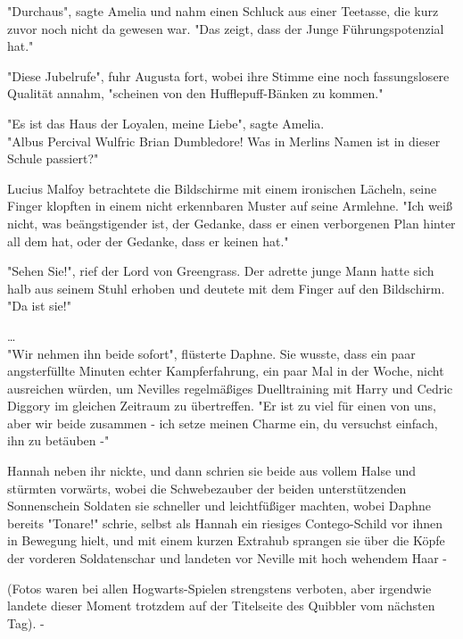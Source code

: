 {"Durchaus", sagte Amelia und nahm einen Schluck aus einer Teetasse, die kurz zuvor noch nicht da gewesen war. "Das zeigt, dass der Junge Führungspotenzial hat."

"Diese Jubelrufe", fuhr Augusta fort, wobei ihre Stimme eine noch fassungslosere Qualität annahm, "scheinen von den Hufflepuff-Bänken zu kommen."

"Es ist das Haus der Loyalen, meine Liebe", sagte Amelia.\\ "Albus Percival Wulfric Brian Dumbledore! Was in Merlins Namen ist in dieser Schule passiert?"

Lucius Malfoy betrachtete die Bildschirme mit einem ironischen Lächeln, seine Finger klopften in einem nicht erkennbaren Muster auf seine Armlehne. "Ich weiß nicht, was beängstigender ist, der Gedanke, dass er einen verborgenen Plan hinter all dem hat, oder der Gedanke, dass er keinen hat."

"Sehen Sie!", rief der Lord von Greengrass. Der adrette junge Mann hatte sich halb aus seinem Stuhl erhoben und deutete mit dem Finger auf den Bildschirm. "Da ist sie!"

…\\ "Wir nehmen ihn beide sofort", flüsterte Daphne. Sie wusste, dass ein paar angsterfüllte Minuten echter Kampferfahrung, ein paar Mal in der Woche, nicht ausreichen würden, um Nevilles regelmäßiges Duelltraining mit Harry und Cedric Diggory im gleichen Zeitraum zu übertreffen. "Er ist zu viel für einen von uns, aber wir beide zusammen - ich setze meinen Charme ein, du versuchst einfach, ihn zu betäuben -"

Hannah neben ihr nickte, und dann schrien sie beide aus vollem Halse und stürmten vorwärts, wobei die Schwebezauber der beiden unterstützenden Sonnenschein Soldaten sie schneller und leichtfüßiger machten, wobei Daphne bereits "Tonare!" schrie, selbst als Hannah ein riesiges Contego-Schild vor ihnen in Bewegung hielt, und mit einem kurzen Extrahub sprangen sie über die Köpfe der vorderen Soldatenschar und landeten vor Neville mit hoch wehendem Haar -

(Fotos waren bei allen Hogwarts-Spielen strengstens verboten, aber irgendwie landete dieser Moment trotzdem auf der Titelseite des Quibbler vom nächsten Tag). -

}
